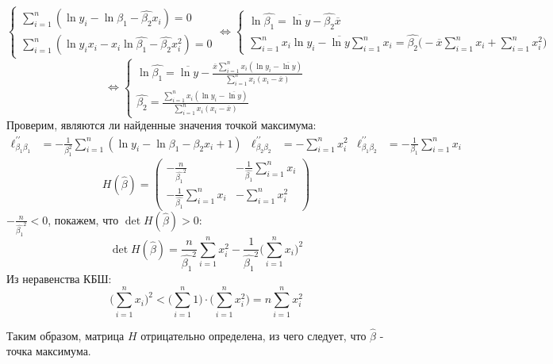 \documentclass[12pt,letterpaper]{article}
\begin{document}
\begin{enumerate} [a)]
{        $$
        \begin{cases}
            \sum\limits_{i=1}^{n}(\ln{y_i} - \ln{\hat{\beta_1}} - \hat{\beta_2} x_i) = 0\\
            \sum\limits_{i=1}^{n}(\ln{y_i}x_i - x_i\ln{\hat{\beta_1}} - \hat{\beta_2} x_i^2) = 0
        \end{cases} \iff
        \begin{cases}
            \ln{\hat{\beta_1}} = \overline{\ln{y}} - \hat{\beta_2}\overline{x} \\
            \sum\limits_{i=1}^{n}x_i \ln{y_i} - \overline{\ln{y}}\sum\limits_{i=1}^{n}x_i = \hat{\beta_2}\Big(-\overline{x}\sum\limits_{i=1}^{n}x_i + \sum\limits_{i=1}^{n}x_i^2 \Big)
        \end{cases}
        $$
        $$
        \iff
        \begin{cases}
            \ln{\hat{\beta_1}} = \overline{\ln{y}} - \frac{\overline{x}\sum\limits_{i=1}^{n}x_i(\ln{y_i}-\overline{\ln{y}})}{\sum\limits_{i=1}^{n}x_i(x_i - \overline{x})}\\
            \hat{\beta_2} = \frac{\sum\limits_{i=1}^{n}x_i(\ln{y_i}-\overline{\ln{y}})}{\sum\limits_{i=1}^{n}x_i(x_i - \overline{x})}
        \end{cases}
        $$
        Проверим, являются ли найденные значения точкой максимума:
        \begin{align*}
            \ell^{\prime\prime}_{\beta_1 \beta_1} &= -\frac{1}{\beta_1^2}\sum\limits_{i=1}^{n}(\ln{y_i} - \ln{\beta_1} - \beta_2 x_i + 1) &
            \ell^{\prime\prime}_{\beta_2 \beta_2} &= -\sum\limits_{i=1}^{n}x_i^2 &
            \ell^{\prime\prime}_{\beta_1 \beta_2} &= -\frac{1}{\beta_1}\sum\limits_{i=1}^{n}x_i
        \end{align*}
        $$ H(\hat{\beta}) =
        \begin{pmatrix}
            -\frac{n}{\hat{\beta_1}^2} & -\frac{1}{\hat{\beta_1}}\sum\limits_{i=1}^{n}x_i \\
            -\frac{1}{\hat{\beta_1}}\sum\limits_{i=1}^{n}x_i & -\sum\limits_{i=1}^{n}x_i^2
        \end{pmatrix}
        $$
        $-\frac{n}{\hat{\beta_1}^2} < 0$, покажем, что $\det{H(\hat{\beta})} > 0$:
        $$\det{H(\hat{\beta})} = \frac{n}{\hat{\beta_1}^2}\sum\limits_{i=1}^{n}x_i^2 - \frac{1}{\hat{\beta_1}^2}\Big(\sum\limits_{i=1}^{n}x_i\Big)^2$$
        Из неравенства КБШ:
        $$\Big(\sum\limits_{i=1}^{n}x_i\Big)^2 < \Big(\sum\limits_{i=1}^{n}1\Big)\cdot \Big(\sum\limits_{i=1}^{n}x_i^2\Big) = n\sum\limits_{i=1}^{n}x_i^2$$
        
        Таким образом, матрица $H$ отрицательно определена, из чего следует, что $\hat{\beta}$ - точка максимума.
    }
\end{enumerate}
\end{document}
